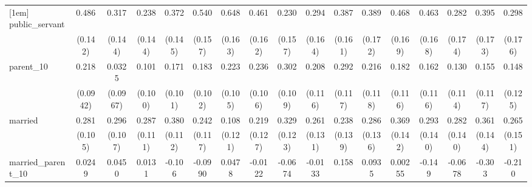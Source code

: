{\begin{tabular}{l*{16}{c}}
[1em]
public\_servant      &       0.486\sym{***}&       0.317\sym{*}  &       0.238         &       0.372\sym{*}  &       0.540\sym{***}&       0.648\sym{***}&       0.461\sym{**} &       0.230         &       0.294         &       0.387\sym{*}  &       0.389\sym{*}  &       0.468\sym{**} &       0.463\sym{**} &       0.282         &       0.395\sym{*}  &       0.298         \\
                    &     (0.142)         &     (0.144)         &     (0.144)         &     (0.145)         &     (0.157)         &     (0.163)         &     (0.162)         &     (0.157)         &     (0.164)         &     (0.161)         &     (0.172)         &     (0.169)         &     (0.168)         &     (0.174)         &     (0.173)         &     (0.176)         \\
[1em]
parent\_10           &       0.218\sym{*}  &      0.0325         &       0.101         &       0.171         &       0.183         &       0.223\sym{*}  &       0.236\sym{*}  &       0.302\sym{**} &       0.208         &       0.292\sym{*}  &       0.216         &       0.182         &       0.162         &       0.130         &       0.155         &       0.148         \\
                    &    (0.0942)         &    (0.0967)         &     (0.100)         &     (0.101)         &     (0.102)         &     (0.105)         &     (0.106)         &     (0.109)         &     (0.116)         &     (0.117)         &     (0.118)         &     (0.116)         &     (0.116)         &     (0.114)         &     (0.117)         &     (0.125)         \\
[1em]
married             &       0.281\sym{**} &       0.296\sym{**} &       0.287\sym{**} &       0.380\sym{***}&       0.242\sym{*}  &       0.108         &       0.219         &       0.329\sym{**} &       0.261\sym{*}  &       0.238         &       0.286\sym{*}  &       0.369\sym{**} &       0.293\sym{*}  &       0.282\sym{*}  &       0.361\sym{*}  &       0.265         \\
                    &     (0.105)         &     (0.107)         &     (0.111)         &     (0.112)         &     (0.117)         &     (0.121)         &     (0.127)         &     (0.123)         &     (0.131)         &     (0.139)         &     (0.136)         &     (0.142)         &     (0.140)         &     (0.140)         &     (0.144)         &     (0.151)         \\
[1em]
married\_parent\_10   &      0.0249         &      0.0450         &      0.0131         &      -0.106         &     -0.0990         &      0.0478         &     -0.0122         &     -0.0674         &     -0.0133         &       0.158         &      0.0935         &     0.00255         &      -0.149         &     -0.0678         &      -0.303         &      -0.210         \\

\end{tabular}}
